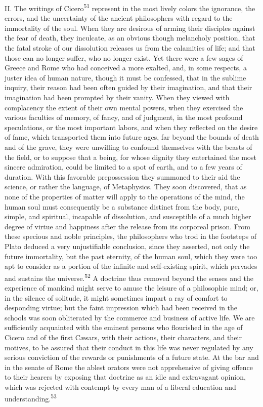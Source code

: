II. The writings of Cicero\textsuperscript{51} represent in the most lively colors
the ignorance, the errors, and the uncertainty of the ancient
philosophers with regard to the immortality of the soul. When
they are desirous of arming their disciples against the fear of
death, they inculcate, as an obvious though melancholy position,
that the fatal stroke of our dissolution releases us from the
calamities of life; and that those can no longer suffer, who no
longer exist. Yet there were a few sages of Greece and Rome who
had conceived a more exalted, and, in some respects, a juster
idea of human nature, though it must be confessed, that in the
sublime inquiry, their reason had been often guided by their
imagination, and that their imagination had been prompted by
their vanity. When they viewed with complacency the extent of
their own mental powers, when they exercised the various
faculties of memory, of fancy, and of judgment, in the most
profound speculations, or the most important labors, and when
they reflected on the desire of fame, which transported them into
future ages, far beyond the bounds of death and of the grave,
they were unwilling to confound themselves with the beasts of the
field, or to suppose that a being, for whose dignity they
entertained the most sincere admiration, could be limited to a
spot of earth, and to a few years of duration. With this
favorable prepossession they summoned to their aid the science,
or rather the language, of Metaphysics. They soon discovered,
that as none of the properties of matter will apply to the
operations of the mind, the human soul must consequently be a
substance distinct from the body, pure, simple, and spiritual,
incapable of dissolution, and susceptible of a much higher degree
of virtue and happiness after the release from its corporeal
prison. From these specious and noble principles, the
philosophers who trod in the footsteps of Plato deduced a very
unjustifiable conclusion, since they asserted, not only the
future immortality, but the past eternity, of the human soul,
which they were too apt to consider as a portion of the infinite
and self-existing spirit, which pervades and sustains the
universe.\textsuperscript{52} A doctrine thus removed beyond the senses and the
experience of mankind might serve to amuse the leisure of a
philosophic mind; or, in the silence of solitude, it might
sometimes impart a ray of comfort to desponding virtue; but the
faint impression which had been received in the schools was soon
obliterated by the commerce and business of active life. We are
sufficiently acquainted with the eminent persons who flourished
in the age of Cicero and of the first Cæsars, with their actions,
their characters, and their motives, to be assured that their
conduct in this life was never regulated by any serious
conviction of the rewards or punishments of a future state. At
the bar and in the senate of Rome the ablest orators were not
apprehensive of giving offence to their hearers by exposing that
doctrine as an idle and extravagant opinion, which was rejected
with contempt by every man of a liberal education and
understanding.\textsuperscript{53}

